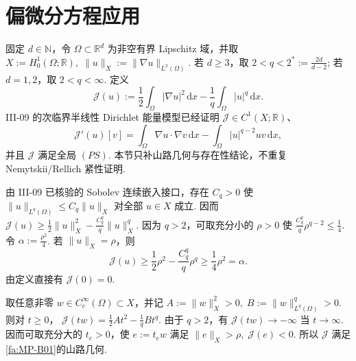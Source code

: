\section{偏微分方程应用}\label{sec:iii10-pde-application}

\begin{FAApplication}
固定 \(\displaystyle d\in\mathbb N\)，令 \(\displaystyle\Omega\subset\mathbb R^d\) 为非空有界 Lipschitz 域，并取
\(\displaystyle X:=H_0^1(\Omega;\mathbb R), \; \|u\|_X:=\|\nabla u\|_{L^2(\Omega)}\).
若 \(\displaystyle d\geqslant3\)，取
\(\displaystyle 2<q<2^*:=\frac{2d}{d-2}\);
若 \(\displaystyle d=1,2\)，取 \(\displaystyle2<q<\infty\). 定义
\[
\mathcal J(u)
:=
\frac{1}{2}\int_\Omega|\nabla u|^2\,\mathrm{d}x
-
\frac{1}{q}\int_\Omega|u|^q\,\mathrm{d}x.
\]
III-09 的次临界半线性 Dirichlet 能量模型已经证明 \(\displaystyle\mathcal J\in C^1(X;\mathbb R)\)、
\[
\mathcal J'(u)[v]
=
\int_\Omega\nabla u\mathbin{\cdot}\nabla v\,\mathrm{d}x
-
\int_\Omega|u|^{q-2}uv\,\mathrm{d}x,
\]
并且 \(\displaystyle\mathcal J\) 满足全局 \(\displaystyle(PS)\). 本节只补山路几何与存在性结论，不重复 Nemytskii/Rellich 紧性证明.
\end{FAApplication}

由 III-09 已核验的 Sobolev 连续嵌入接口，存在 \(\displaystyle C_q>0\) 使
\(\displaystyle \|u\|_{L^q(\Omega)} \leqslant C_q\|u\|_X\)
对全部 \(\displaystyle u\in X\) 成立. 因而
\(\displaystyle \mathcal J(u) \geqslant \frac{1}{2}\|u\|_X^2 - \frac{C_q^q}{q}\|u\|_X^q\).
因为 \(\displaystyle q>2\)，可取充分小的 \(\displaystyle\rho>0\) 使
\(\displaystyle \frac{C_q^q}{q}\rho^{q-2} \leqslant \frac{1}{4}\).
令 \(\displaystyle\alpha:=\frac{\rho^2}{4}\). 若 \(\displaystyle\|u\|_X=\rho\)，则
\[
\mathcal J(u)
\geqslant
\frac{1}{2}\rho^2
-
\frac{C_q^q}{q}\rho^q
\geqslant
\frac{1}{4}\rho^2
=
\alpha.
\]
由定义直接有 \(\displaystyle\mathcal J(0)=0\).

取任意非零 \(\displaystyle w\in C_c^\infty(\Omega)\subset X\)，并记
\(\displaystyle A:=\|w\|_X^2>0, \; B:=\|w\|_{L^q(\Omega)}^q>0\).
则对 \(\displaystyle t\geqslant0\)，
\(\displaystyle \mathcal J(tw) = \frac{1}{2}At^2 - \frac{1}{q}Bt^q\).
由于 \(\displaystyle q>2\)，有 \(\displaystyle\mathcal J(tw)\to-\infty\) 当 \(\displaystyle t\to\infty\). 因而可取充分大的 \(\displaystyle t_e>0\)，使 \(\displaystyle e:=t_ew\) 满足
\(\displaystyle \|e\|_X>\rho, \; \mathcal J(e)<0\).
所以 \(\displaystyle\mathcal J\) 满足\autoref{fa:MP-B01}的山路几何.

